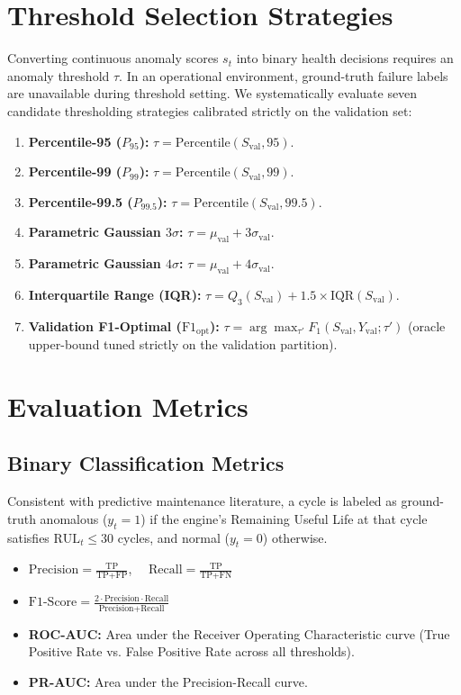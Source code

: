 \documentclass[12pt,a4paper,oneside]{report}
\begin{document}
\section{Threshold Selection Strategies}
Converting continuous anomaly scores $s_t$ into binary health decisions requires an anomaly threshold $\tau$. In an operational environment, ground-truth failure labels are unavailable during threshold setting. We systematically evaluate seven candidate thresholding strategies calibrated strictly on the validation set:
\begin{enumerate}
    \item \textbf{Percentile-95 ($P_{95}$):} $\tau = \text{Percentile}(S_{\text{val}}, 95)$.
    \item \textbf{Percentile-99 ($P_{99}$):} $\tau = \text{Percentile}(S_{\text{val}}, 99)$.
    \item \textbf{Percentile-99.5 ($P_{99.5}$):} $\tau = \text{Percentile}(S_{\text{val}}, 99.5)$.
    \item \textbf{Parametric Gaussian $3\sigma$:} $\tau = \mu_{\text{val}} + 3\sigma_{\text{val}}$.
    \item \textbf{Parametric Gaussian $4\sigma$:} $\tau = \mu_{\text{val}} + 4\sigma_{\text{val}}$.
    \item \textbf{Interquartile Range (IQR):} $\tau = Q_3(S_{\text{val}}) + 1.5 \times \text{IQR}(S_{\text{val}})$.
    \item \textbf{Validation F1-Optimal ($\text{F1}_{\text{opt}}$):} $\tau = \arg\max_{\tau'} F_1(S_{\text{val}}, Y_{\text{val}}; \tau')$ (oracle upper-bound tuned strictly on the validation partition).
\end{enumerate}

\section{Evaluation Metrics}
\subsection{Binary Classification Metrics}
Consistent with predictive maintenance literature, a cycle is labeled as ground-truth anomalous ($y_t = 1$) if the engine's Remaining Useful Life at that cycle satisfies $\text{RUL}_t \le 30$ cycles, and normal ($y_t = 0$) otherwise.
\begin{itemize}
    \item $\text{Precision} = \frac{\text{TP}}{\text{TP} + \text{FP}}$, $\quad \text{Recall} = \frac{\text{TP}}{\text{TP} + \text{FN}}$
    \item $\text{F1-Score} = \frac{2 \cdot \text{Precision} \cdot \text{Recall}}{\text{Precision} + \text{Recall}}$
    \item \textbf{ROC-AUC:} Area under the Receiver Operating Characteristic curve (True Positive Rate vs. False Positive Rate across all thresholds).
    \item \textbf{PR-AUC:} Area under the Precision-Recall curve.
\end{itemize}
\end{document}
